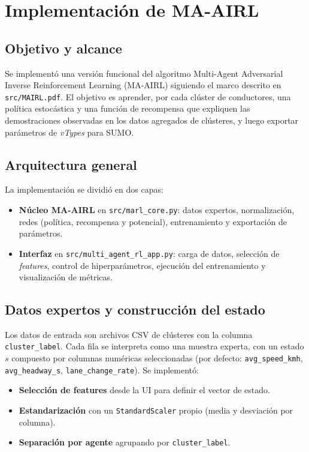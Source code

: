 \section{Implementación de MA-AIRL}

\subsection{Objetivo y alcance}
Se implementó una versión funcional del algoritmo Multi-Agent Adversarial Inverse Reinforcement Learning (MA-AIRL) siguiendo el marco descrito en \texttt{src/MAIRL.pdf}. El objetivo es aprender, por cada clúster de conductores, una política estocástica y una función de recompensa que expliquen las demostraciones observadas en los datos agregados de clústeres, y luego exportar parámetros de \textit{vTypes} para SUMO.

\subsection{Arquitectura general}
La implementación se dividió en dos capas:
\begin{itemize}
\item \textbf{Núcleo MA-AIRL} en \texttt{src/marl\_core.py}: datos expertos, normalización, redes (política, recompensa y potencial), entrenamiento y exportación de parámetros.
\item \textbf{Interfaz} en \texttt{src/multi\_agent\_rl\_app.py}: carga de datos, selección de \textit{features}, control de hiperparámetros, ejecución del entrenamiento y visualización de métricas.
\end{itemize}

\subsection{Datos expertos y construcción del estado}
Los datos de entrada son archivos CSV de clústeres con la columna \texttt{cluster\_label}. Cada fila se interpreta como una muestra experta, con un estado $s$ compuesto por columnas numéricas seleccionadas (por defecto: \texttt{avg\_speed\_kmh}, \texttt{avg\_headway\_s}, \texttt{lane\_change\_rate}). Se implementó:
\begin{itemize}
\item \textbf{Selección de features} desde la UI para definir el vector de estado.
\item \textbf{Estandarización} con un \texttt{StandardScaler} propio (media y desviación por columna).
\item \textbf{Separación por agente} agrupando por \texttt{cluster\_label}.
\end{itemize}

